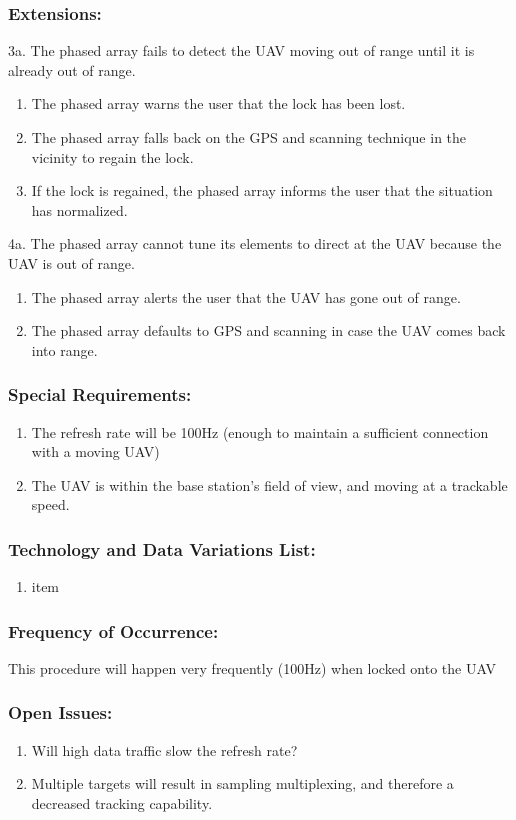 \documentclass[ProductRequirements.tex]{subfiles}
\begin{document}
	\subsubsection*{Extensions:}
	3a. The phased array fails to detect the UAV moving out of range until it is already out of range.
	\begin{enumerate}
		\item The phased array warns the user that the lock has been lost.
		\item The phased array falls back on the GPS and scanning technique in the vicinity to regain the lock.
		\item If the lock is regained, the phased array informs the user that the situation has normalized.
	\end{enumerate}
	4a. The phased array cannot tune its elements to direct at the UAV because the UAV is out of range.
	\begin{enumerate}
		\item The phased array alerts the user that the UAV has gone out of range.
		\item The phased array defaults to GPS and scanning in case the UAV comes back into range.
	\end{enumerate}
	\subsubsection*{Special Requirements:}
	\begin{enumerate}\itemsep1pt
		\item The refresh rate will be 100Hz (enough to maintain a sufficient connection with a moving UAV)
		\item The UAV is within the base station's field of view, and moving at a trackable speed. 
	\end{enumerate}
	\subsubsection*{Technology and Data Variations List:}
	\begin{enumerate}\itemsep1pt
		\item item
	\end{enumerate}
	\subsubsection*{Frequency of Occurrence:}
	This procedure will happen very frequently (100Hz) when locked onto the UAV
	\subsubsection*{Open Issues:}
	\begin{enumerate}\itemsep1pt
		\item Will high data traffic slow the refresh rate?
		\item Multiple targets will result in sampling multiplexing, and therefore a decreased tracking capability. 
	\end{enumerate}		
	
\end{document}
